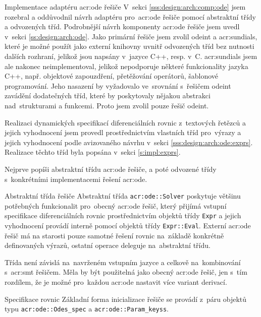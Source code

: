 \documentclass[thesis=M,czech]{FITthesis}[2012/06/26]
\newcommand{\acrlabel}[1]{acr:#1}
\newcommand{\acr}[1]{\acrshort{\acrlabel{#1}}}
\newcommand{\id}[1]{\texttt{#1}}
\newcommand{\rf}[1]{\ref{#1}}
\begin{document}

\begin{section}{Implementace adaptéru \acr{ode} řešiče}\label{s:impl:ode}
V~sekci \rf{sss:design:arch:comp:ode} jsem rozebral
a oddůvodnil návrh adaptéru pro~\acr{ode} řešiče
pomocí abstraktní třídy a odvozených tříd.
Podrobnější návrh komponenty \acr{ode} řešiče
jsem uvedl v~sekci \rf{ss:design:arch:ode}.
Jako primární řešiče jsem zvolil odeint a \acr{sundials},
které je možné použít jako externí knihovny
uvnitř odvozených tříd bez nutnosti dalších rozhraní,
jelikož jsou napsány v~jazyce C++, resp. v~C.
\acr{sundials} jsem ale nakonec neimplementoval,
jelikož nepodporuje některé funkcionality jazyka C++,
např. objektové zapouzdření,
přetěžování operátorů, šablonové programování.
Jeho nasazení by vyžadovalo ve~srovnání s~řešičem odeint
zavádění dodatečných tříd,
které by poskytovaly nějakou abstrakci nad~strukturami a funkcemi.
Proto jsem zvolil pouze řešič odeint.

Realizaci dynamických specifikací diferenciálních rovnic
z~textových řetězců a jejich vyhodnocení
jsem provedl prostřednictvím
vlastních tříd pro~výrazy a jejich vyhodnocení
podle avizovaného návrhu v~sekci \rf{sss:design:arch:ode:exprs}.
Realizace těchto tříd byla popsána v~sekci \rf{s:impl:exprs}.

Nejprve popíši abstraktní třídu \acr{ode} řešiče,
a poté odvozené třídy s~konkrétními implementacemi řešení \acr{ode}.


\begin{subsection}{Abstraktní třída řešiče}
\label{ss:impl:ode:solver}
Abstraktní třída \id{\acr{ode}::\-Solver}
poskytuje většinu potřebných funkcionalit
pro~obecný \acr{ode} řešič,
který přijímá vstupní specifikace diferenciálních
rovnic prostřednictvím objektů třídy \id{Expr}
a jejich vyhodnocení provádí interně
pomocí objektů třídy \id{Expr::\-Eval}.
Externí \acr{ode} řešič má na starosti
pouze samotné řešení rovnic na~základě
konkrétně definovaných výrazů,
ostatní operace deleguje na~abstraktní třídu.

Třída není závislá na~navrženém vstupním jazyce
a celkově na~kombinování s~\acr{smt} řešičem.
Měla by být použitelná jako obecný \acr{ode} řešič,
jen s~tím rozdílem, že je možné pro~každou \acr{ode}
nastavit více variant derivací.


\begin{subsubsection}{Specifikace rovnic}\label{sss:impl:ode:solver:spec}
Základní forma inicializace řešiče se provádí
z~páru objektů typu \id{\acr{ode}::\-Odes\_\-spec}
a \id{\acr{ode}::\-Param\_\-keyss}.


\end{subsubsection}
\end{subsection}
\end{section}
\end{document}

